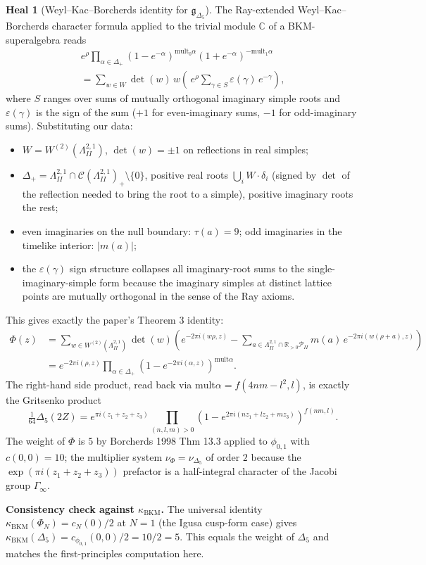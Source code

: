 \documentclass[11pt]{article}
\theoremstyle{definition}
\newtheorem{heal}[theorem]{Heal}
\providecommand{\C}{\mathbb{C}}
\providecommand{\R}{\mathbb{R}}
\providecommand{\g}{\mathfrak{g}}
\providecommand{\mult}{\mathrm{mult}}
\providecommand{\LII}{\Lambda^{2,1}_{I\!I}}
\providecommand{\PII}{\mathcal{P}_{I\!I}}
\providecommand{\CII}{\mathcal{C}(\LII)_+}
\providecommand{\kBKM}{\kappa_{\mathrm{BKM}}}
\providecommand{\Deltafive}{\Delta_5}
\providecommand{\phionezero}{\phi_{0,1}}
\begin{document}
\begin{heal}[Weyl--Kac--Borcherds identity for $\g_{\Deltafive}$]
\label{heal:weyl-kac-borcherds}
The Ray-extended Weyl--Kac--Borcherds character formula applied to the
trivial module $\C$ of a BKM-superalgebra reads
\begin{multline*}
e^{\rho}\!\prod_{\alpha\in\Delta_+}\!(1-e^{-\alpha})^{\mult_0\alpha}
            (1+e^{-\alpha})^{-\mult_1\alpha}\\
= \sum_{w\in W}\det(w)\,w\!\left(\,
  e^\rho\!\sum_{\gamma\in S}\varepsilon(\gamma)\,
  e^{-\gamma}\right),
\end{multline*}
where $S$ ranges over sums of mutually orthogonal imaginary simple
roots and $\varepsilon(\gamma)$ is the sign of the sum
($+1$ for even-imaginary sums, $-1$ for odd-imaginary sums).
Substituting our data:
\begin{itemize}
\item $W=W^{(2)}(\LII)$, $\det(w)=\pm 1$ on reflections in real
simples;
\item $\Delta_+=\LII\cap\CII\setminus\{0\}$, positive real roots
$\bigcup_i W\cdot\delta_i$ (signed by $\det$ of the reflection needed
to bring the root to a simple), positive imaginary roots the rest;
\item even imaginaries on the null boundary: $\tau(a)=9$;
odd imaginaries in the timelike interior: $|m(a)|$;
\item the $\varepsilon(\gamma)$ sign structure collapses all
imaginary-root sums to the single-imaginary-simple form because the
imaginary simples at distinct lattice points are mutually orthogonal
in the sense of the Ray axioms.
\end{itemize}
This gives exactly the paper's Theorem 3 identity:
\begin{align*}
\Phi(z) &= \sum_{w\in W^{(2)}(\LII)}\!\!\det(w)\!\left(
  e^{-2\pi i(w\rho,z)}
  - \!\!\!\sum_{a\in\LII\cap\R_{>0}\PII}\!\!m(a)\,e^{-2\pi i(w(\rho+a),z)}
  \right)\\
&= e^{-2\pi i(\rho,z)}\prod_{\alpha\in\Delta_+}(1-e^{-2\pi i(\alpha,z)})^{\mult\alpha}.
\end{align*}
The right-hand side product, read back via $\mult\alpha=f(4nm-l^2,l)$,
is exactly the Gritsenko product
\[
\tfrac{1}{64}\Deltafive(2Z)
= e^{\pi i(z_1+z_2+z_3)}\!\prod_{(n,l,m)>0}(1-e^{2\pi i(nz_1+lz_2+mz_3)})^{f(nm,l)}.
\]
The weight of $\Phi$ is $5$ by Borcherds 1998 Thm 13.3 applied to
$\phionezero$ with $c(0,0)=10$; the multiplier system
$\nu_\Phi=\nu_{\Deltafive}$ of order $2$ because the
$\exp(\pi i(z_1+z_2+z_3))$ prefactor is a half-integral character of
the Jacobi group $\Gamma_\infty$.

\textbf{Consistency check against $\kBKM$.} The universal identity
$\kBKM(\Phi_N)=c_N(0)/2$ at $N=1$ (the Igusa cusp-form case) gives
$\kBKM(\Deltafive)=c_{\phionezero}(0,0)/2=10/2=5$. This equals the
weight of $\Deltafive$ and matches the first-principles computation here.
\end{heal}
\end{document}
